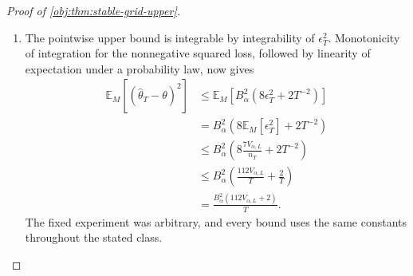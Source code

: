 \documentclass[11pt]{article}
\begin{document}
\begin{proof}[Proof of \cref{obj:thm:stable-grid-upper}]
\begin{enumerate}
\item The pointwise upper bound is integrable by integrability of \(\epsilon_T^2\). Monotonicity of integration for the nonnegative squared loss, followed by linearity of expectation under a probability law, now gives
\[
\begin{aligned}
\mathbb E_M[(\widehat\theta_T-\theta)^2]
&\le
\mathbb E_M\!\left[
 B_\alpha^2(8\epsilon_T^2+2T^{-2})
\right]\\
&=
B_\alpha^2\left(8\mathbb E_M[\epsilon_T^2]+2T^{-2}\right)\\
&\le
B_\alpha^2\left(
 8\frac{7V_{\alpha,L}}{n_T}+2T^{-2}
\right)\\
&\le
B_\alpha^2\left(
 \frac{112V_{\alpha,L}}T+\frac2T
\right)\\
&=
\frac{B_\alpha^2(112V_{\alpha,L}+2)}T.
\end{aligned}
\]
The fixed experiment was arbitrary, and every bound uses the same constants throughout the stated class.
\end{enumerate}
\end{proof}
\end{document}
